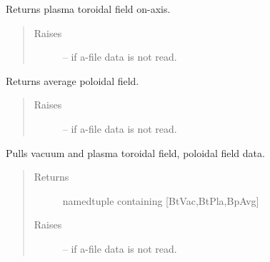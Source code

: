 \documentclass[letterpaper,10pt,english]{sphinxmanual}
\begin{document}
\begin{fulllineitems}
\begin{fulllineitems}
\begin{quote}
\begin{description}
\end{description}\end{quote}

\end{fulllineitems}


\begin{fulllineitems}
\label{eqtools:eqtools.eqdskreader.EqdskReader.getBtPla}
Returns plasma toroidal field on-axis.
\begin{quote}\begin{description}
\item[{Raises }] \leavevmode
{} -- 
if a-file data is not read.

\end{description}\end{quote}

\end{fulllineitems}


\begin{fulllineitems}
\label{eqtools:eqtools.eqdskreader.EqdskReader.getBpAvg}
Returns average poloidal field.
\begin{quote}\begin{description}
\item[{Raises }] \leavevmode
{} -- 
if a-file data is not read.

\end{description}\end{quote}

\end{fulllineitems}


\begin{fulllineitems}
\label{eqtools:eqtools.eqdskreader.EqdskReader.getFields}
Pulls vacuum and plasma toroidal field, poloidal field data.
\begin{quote}\begin{description}
\item[{Returns}] \leavevmode
namedtuple containing {[}BtVac,BtPla,BpAvg{]}

\item[{Raises }] \leavevmode
{} -- 
if a-file data is not read.


\end{description}
\end{quote}
\end{fulllineitems}
\end{fulllineitems}
\end{document}
